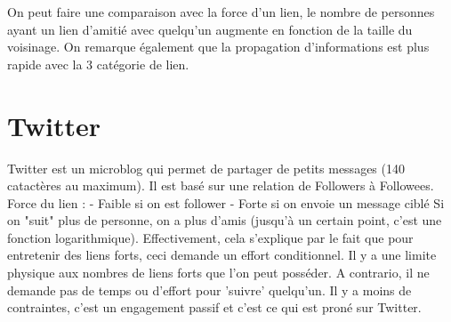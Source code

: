 On peut faire une comparaison avec la force d'un lien, le nombre de personnes ayant un lien d'amitié avec quelqu'un augmente en fonction de la taille du voisinage. 
On remarque également que la propagation d'informations est plus rapide avec la 3 catégorie de lien.
\newline
\section{Twitter}
Twitter est un microblog qui permet de partager de petits messages (140 catactères au maximum). Il est basé sur une relation de Followers à Followees.
Force du lien :
- Faible si on est follower
- Forte si on envoie un message ciblé
Si on "suit" plus de personne, on a plus d'amis (jusqu'à un certain point, c'est une fonction logarithmique). Effectivement, cela s'explique par le fait que pour entretenir des liens forts, ceci demande un effort conditionnel. Il y a une limite physique aux nombres de liens forts que l'on peut posséder. A contrario, il ne demande pas de temps ou d'effort pour 'suivre' quelqu'un. Il y a moins de contraintes, c'est un engagement passif et c'est ce qui est proné sur Twitter.